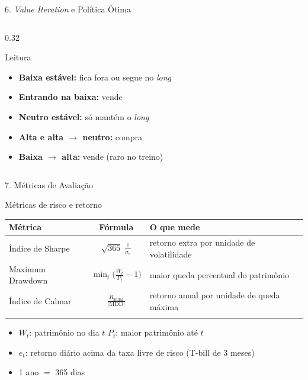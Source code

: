 \documentclass[aspectratio=169,10pt,t]{beamer}
\newenvironment{altura}[2][c]{\begin{minipage}[t][#2][#1]{\linewidth}}{\end{minipage}}
\begin{document}
\begin{frame}{6. \textit{Value Iteration} e Política Ótima}
\begin{columns}[T,onlytextwidth]
    \begin{column}{0.32\textwidth}
      \begin{block}{Leitura}
        \begin{altura}{3.7cm}
        \footnotesize
        \begin{itemize}\setlength{\itemsep}{3pt}
          \item \textbf{Baixa estável:} fica fora ou segue no \textit{long}
          \item \textbf{Entrando na baixa:} vende
          \item \textbf{Neutro estável:} só mantém o \textit{long}
          \item \textbf{Alta e alta $\to$ neutro:} compra
          \item \textbf{Baixa $\to$ alta:} vende (raro no treino)
        \end{itemize}
        \end{altura}
      \end{block}
    \end{column}
  \end{columns}

\end{frame}

\begin{frame}{7. Métricas de Avaliação}

  \begin{block}{Métricas de risco e retorno}
    \centering\small
    \setlength{\tabcolsep}{10pt}
    \begin{tabular}{l c l}
      \toprule
      \textbf{Métrica} & \textbf{Fórmula} & \textbf{O que mede} \\
      \midrule
      \addlinespace[5pt]
      Índice de Sharpe   & $\displaystyle \sqrt{365}\;\frac{\bar e}{\sigma_e}$    & retorno extra por unidade de volatilidade \\
      \addlinespace[9pt]
      Maximum Drawdown   & $\displaystyle \min_t \Big(\frac{W_t}{P_t} - 1\Big)$ & maior queda percentual do patrimônio \\
      \addlinespace[9pt]
      Índice de Calmar   & $\displaystyle \frac{R_{\text{anual}}}{|\text{MDD}|}$ & retorno anual por unidade de queda máxima \\
      \addlinespace[5pt]
      \bottomrule
    \end{tabular}
  \end{block}

  \footnotesize
  \begin{itemize}\setlength{\itemsep}{2pt}
    \item $W_t$: patrimônio no dia $t$ \qquad $P_t$: maior patrimônio até $t$
    \item $e_t$: retorno diário acima da taxa livre de risco (T-bill de 3 meses)
    \item 1 ano $=$ 365 dias
  \end{itemize}

\end{frame}
\end{document}
